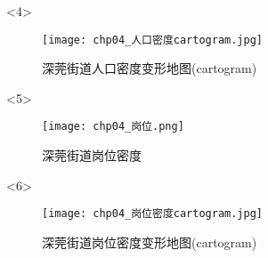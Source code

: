 \begin{frame}[t]{\subsecname}
\begin{overlayarea}{\textwidth}{\textheight}
  \begin{onlyenv}<4>
\begin{figure}
  \centering
  \texttt{[image: chp04\_人口密度cartogram.jpg]}
  \caption{深莞街道人口密度变形地图(cartogram)}
\end{figure}
  \end{onlyenv}

  \begin{onlyenv}<5>
\begin{figure}
  \centering
  \texttt{[image: chp04\_岗位.png]}
  \caption{深莞街道岗位密度}
\end{figure}
  \end{onlyenv}

  \begin{onlyenv}<6>
\begin{figure}
  \centering
  \texttt{[image: chp04\_岗位密度cartogram.jpg]}
  \caption{深莞街道岗位密度变形地图(cartogram)}
\end{figure}
  \end{onlyenv}
\end{overlayarea}
\end{frame}

